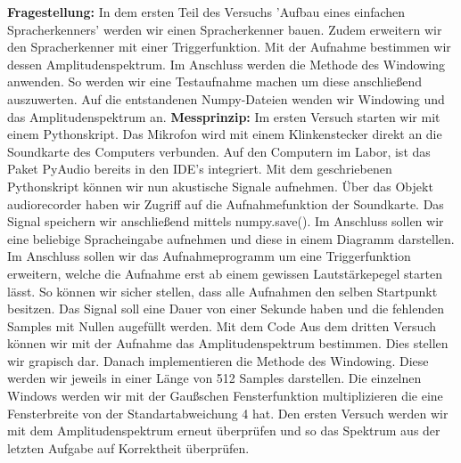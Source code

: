 \documentclass[12pt, oneside, a4paper, \docLanguage]{report}
\begin{document}
\textbf{Fragestellung:}
\newline
In dem ersten Teil des Versuchs 'Aufbau eines einfachen Spracherkenners' werden wir einen Spracherkenner bauen.
Zudem erweitern wir den Spracherkenner mit einer Triggerfunktion.
Mit der Aufnahme bestimmen wir dessen Amplitudenspektrum.
Im Anschluss werden die Methode des Windowing anwenden.
\newline
So werden wir eine Testaufnahme machen um diese anschließend auszuwerten. 
\newline
Auf die entstandenen Numpy-Dateien wenden wir Windowing und das Amplitudenspektrum an.
\newline
\newline
\textbf{Messprinzip:}
\newline
Im ersten Versuch starten wir mit einem Pythonskript. Das Mikrofon wird mit einem Klinkenstecker direkt an die Soundkarte des Computers verbunden.
Auf den Computern im Labor, ist das Paket PyAudio bereits in den IDE's integriert.
\newline
Mit dem geschriebenen Pythonskript können wir nun akustische Signale aufnehmen. 
Über das Objekt audiorecorder haben wir Zugriff auf die Aufnahmefunktion der Soundkarte.
\newline
Das Signal speichern wir anschließend mittels numpy.save().
Im Anschluss sollen wir eine beliebige Spracheingabe aufnehmen und diese in einem Diagramm darstellen.
\newline
\newline
Im Anschluss sollen wir das Aufnahmeprogramm um eine Triggerfunktion erweitern, welche die Aufnahme erst ab einem gewissen Lautstärkepegel starten lässt.
\newline
So können wir sicher stellen, dass alle Aufnahmen den selben Startpunkt besitzen.
\newpage
Das Signal soll eine Dauer von einer Sekunde haben und die fehlenden Samples mit Nullen augefüllt werden.
\newline
\newline
Mit dem Code Aus dem dritten Versuch können wir mit der Aufnahme das Amplitudenspektrum bestimmen.
Dies stellen wir grapisch dar.
Danach implementieren die Methode des Windowing. 
\newline
Diese werden wir jeweils in einer Länge von 512 Samples darstellen.
Die einzelnen Windows werden wir mit der Gaußschen Fensterfunktion multiplizieren  die eine Fensterbreite von der Standartabweichung 4 hat.
\newline
Den ersten Versuch werden wir mit dem Amplitudenspektrum erneut überprüfen und so das Spektrum aus der letzten Aufgabe auf Korrektheit überprüfen.
\end{document}
